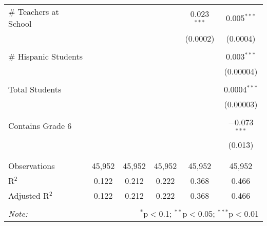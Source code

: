 \begin{table}[!htbp]
\begin{tabular}{@{\extracolsep{-2pt}}lccccc}
 \# Teachers at School &  &  &  & 0.023$^{***}$ & 0.005$^{***}$ \\ 
  &  &  &  & (0.0002) & (0.0004) \\ 
  & & & & & \\ 
 \# Hispanic Students &  &  &  &  & 0.003$^{***}$ \\ 
  &  &  &  &  & (0.00004) \\ 
  & & & & & \\ 
 Total Students &  &  &  &  & 0.0004$^{***}$ \\ 
  &  &  &  &  & (0.00003) \\ 
  & & & & & \\ 
 Contains Grade 6 &  &  &  &  & $-$0.073$^{***}$ \\ 
  &  &  &  &  & (0.013) \\ 
  & & & & & \\ 
\hline \\[-1.8ex] 
Observations & 45,952 & 45,952 & 45,952 & 45,952 & 45,952 \\ 
R$^{2}$ & 0.122 & 0.212 & 0.222 & 0.368 & 0.466 \\ 
Adjusted R$^{2}$ & 0.122 & 0.212 & 0.222 & 0.368 & 0.466 \\ 
\hline 
\hline \\[-1.8ex] 
\textit{Note:}  & \multicolumn{5}{r}{$^{*}$p$<$0.1; $^{**}$p$<$0.05; $^{***}$p$<$0.01} \\ 
\end{tabular} 
\end{table} 
